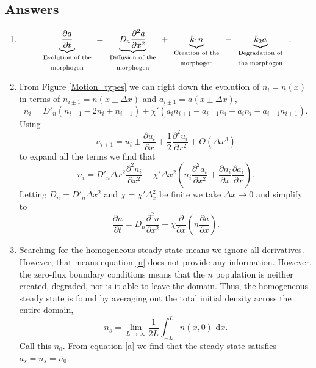 \documentclass[10pt]{article}
\newcommand{\bb}{\begin{equation}}
\newcommand{\ee}{\end{equation}}
\newcommand{\D}[2]{\frac{\partial #1}{\partial #2}}
\newcommand{\DD}[2]{\frac{\partial^2 #1}{\partial #2^2}}
\newcommand{\UB}[2]{\underbrace{#1}_{\textrm{\parbox{8em}{\centering #2}}}}
\newcommand{\rd}{\text{ d}}
\newcommand{\fig}[1]{Figure \ref{#1}}
\newcommand{\eqn}[1]{equation \eqref{#1}}
\renewcommand{\l}{\left(}
\renewcommand{\r}{\right)}
\begin{document}
\begin{Answ}
\subsection{Answers}
\begin{enumerate}
\item 
\bb
\UB{\D{a}{t}}{Evolution of the morphogen}=\UB{D_a\DD{a}{x}}{Diffusion of the morphogen}+\UB{k_1n}{Creation of the morphogen}-\UB{k_2a}{Degradation of the morphogen}.
\ee


\item From \fig{Motion_types} we can right down the evolution of $n_i=n(x)$ in terms of $n_{i\pm 1}=n(x\pm\Delta x)$ and $a_{i\pm 1}=a(x\pm\Delta x)$,
\bb
\dot{n}_i=D'_n\l n_{i-1}-2n_i+n_{i+1}\r+\chi' \l a_in_{i+1}-a_{i-1}n_i+a_in_i-a_{i+1}n_{i+1} \r.
\ee
Using
\bb
u_{i\pm1}=u_i\pm \D{u_i}{x}+\frac{1}{2}\DD{u_i}{x}+O(\Delta x^3)
\ee
to expand all the terms we find that
\bb
\dot{n}_i=D'_n\Delta x^2 \DD{n_i}{x}-\chi'\Delta x^2 \l n_i\DD{a_i}{x}+\D{n_i}{x}\D{a_i}{x} \r.
\ee
Letting $D_n=D'_n\Delta x^2$ and $\chi=\chi'\Delta_x^2$ be finite we take $\Delta x\rightarrow 0$ and simplify to
\bb
\D{n}{t}=D_n\DD{n}{x}-\chi\D{}{x}\l n\D{a}{x}\r.
\ee

\item Searching for the homogeneous steady state means we ignore all derivatives. However, that means \eqn{n} does not provide any information. However, the zero-flux boundary conditions means that the $n$ population is neither created, degraded, nor is it able to leave the domain. Thus, the homogeneous steady state is found by averaging out the total initial density across the entire domain,
\bb
n_s=\lim_{L\rightarrow \infty}\frac{1}{2L}\int^L_{-L} n(x,0) \rd x.
\ee
Call this $n_0$.
From \eqn{a} we find that the steady state satisfies $a_s=n_s=n_0$.


\end{enumerate}
\end{Answ}
\end{document}

